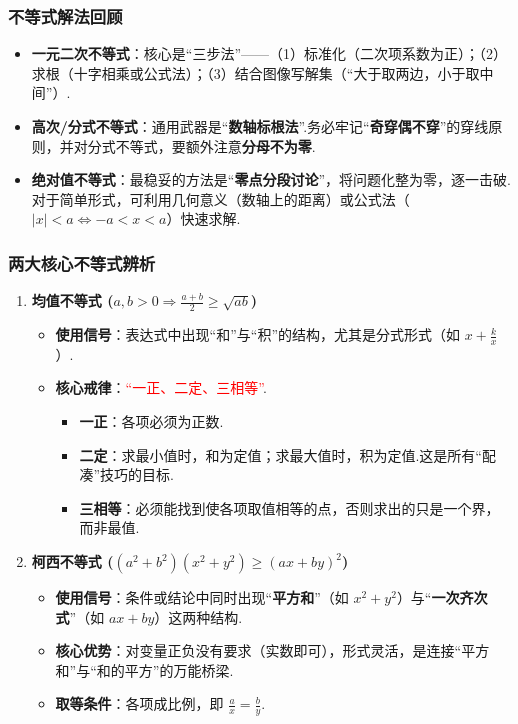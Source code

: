 \subsubsection*{不等式解法回顾}
\begin{itemize}
	\item \textbf{一元二次不等式}：核心是“三步法”——（1）标准化（二次项系数为正）；（2）求根（十字相乘或公式法）；（3）结合图像写解集（“大于取两边，小于取中间”）.
	\item \textbf{高次/分式不等式}：通用武器是“\textbf{数轴标根法}”.务必牢记“\textbf{奇穿偶不穿}”的穿线原则，并对分式不等式，要额外注意\textbf{分母不为零}.
	\item \textbf{绝对值不等式}：最稳妥的方法是“\textbf{零点分段讨论}”，将问题化整为零，逐一击破.对于简单形式，可利用几何意义（数轴上的距离）或公式法（$|x|<a \Leftrightarrow -a<x<a$）快速求解.
\end{itemize}

\subsubsection*{两大核心不等式辨析}
\begin{enumerate}
	\item \textbf{均值不等式 ($a,b>0 \Rightarrow \frac{a+b}{2} \ge \sqrt{ab}$)}
	\begin{itemize}
		\item \textbf{使用信号}：表达式中出现“和”与“积”的结构，尤其是分式形式（如 $x+\frac{k}{x}$）.
		\item \textbf{核心戒律}：\textcolor{red}{“一正、二定、三相等”}.
		\begin{itemize}
			\item \textbf{一正}：各项必须为正数.
			\item \textbf{二定}：求最小值时，和为定值；求最大值时，积为定值.这是所有“配凑”技巧的目标.
			\item \textbf{三相等}：必须能找到使各项取值相等的点，否则求出的只是一个界，而非最值.
		\end{itemize}
	\end{itemize}
	\item \textbf{柯西不等式 ($(a^2+b^2)(x^2+y^2) \ge (ax+by)^2$)}
	\begin{itemize}
		\item \textbf{使用信号}：条件或结论中同时出现“\textbf{平方和}”（如 $x^2+y^2$）与“\textbf{一次齐次式}”（如 $ax+by$）这两种结构.
		\item \textbf{核心优势}：对变量正负没有要求（实数即可），形式灵活，是连接“平方和”与“和的平方”的万能桥梁.
		\item \textbf{取等条件}：各项成比例，即 $\frac{a}{x}=\frac{b}{y}$.
	\end{itemize}
\end{enumerate}

